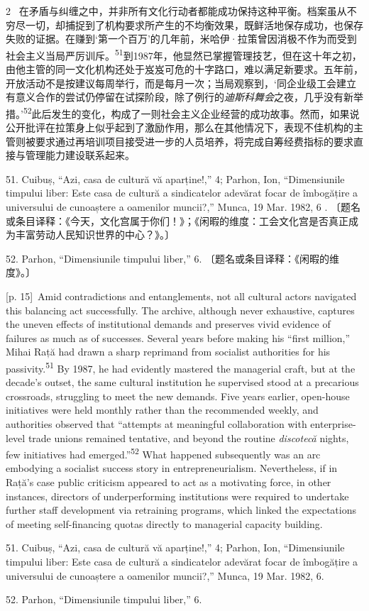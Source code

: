 \documentclass[10pt,a4paper]{article}
\begin{document}
\begin{paracol}{2}
\switchcolumn*
{\scriptsize\color{gray} [p. 15]}\ 在矛盾与纠缠之中，并非所有文化行动者都能成功保持这种平衡。档案虽从不穷尽一切，却捕捉到了机构要求所产生的不均衡效果，既鲜活地保存成功，也保存失败的证据。在赚到‘第一个百万’的几年前，米哈伊·拉策曾因消极不作为而受到社会主义当局严厉训\mbox{斥。\textsuperscript{51}}到1987年，他显然已掌握管理技艺，但在这十年之初，由他主管的同一文化机构还处于岌岌可危的十字路口，难以满足新要求。五年前，开放活动不是按建议每周举行，而是每月一次；当局观察到，‘同企业级工会建立有意义合作的尝试仍停留在试探阶段，除了例行的\textit{迪斯科舞会}之夜，几乎没有新举措。’\nobreak\textsuperscript{52}此后发生的变化，构成了一则社会主义企业经营的成功故事。然而，如果说公开批评在拉策身上似乎起到了激励作用，那么在其他情况下，表现不佳机构的主管则被要求通过再培训项目接受进一步的人员培养，将完成自筹经费指标的要求直接与管理能力建设联系起来。\par{\small 51. Cuibuș, “Azi, casa de cultură vă aparține!,” 4; Parhon, Ion, “Dimensiunile timpului liber: Este casa de cultură a sindicatelor adevărat focar de îmbogățire a universului de cunoaștere a oamenilor muncii?,” Munca, 19 Mar. 1982, 6 . 〔题名或条目译释：《今天，文化宫属于你们！》；《闲暇的维度：工会文化宫是否真正成为丰富劳动人民知识世界的中心？》。〕\par}{\small 52. Parhon, “Dimensiunile timpului liber,” 6. 〔题名或条目译释：《闲暇的维度》。〕\par}
\switchcolumn
{\scriptsize\color{gray} [p. 15]}\ Amid contradictions and entanglements, not all cultural actors navigated this balancing act successfully. The archive, although never exhaustive, captures the uneven effects of institutional demands and preserves vivid evidence of failures as much as of successes. Several years before making his “first million,” Mihai Rață had drawn a sharp reprimand from socialist authorities for his passivity.\nobreak\textsuperscript{51} By 1987, he had evidently mastered the managerial craft, but at the decade’s outset, the same cultural institution he supervised stood at a precarious crossroads, struggling to meet the new demands. Five years earlier, open-house initiatives were held monthly rather than the recommended weekly, and authorities observed that “attempts at meaningful collaboration with enterprise-level trade unions remained tentative, and beyond the routine \textit{discotecă} nights, few initiatives had emerged.”\nobreak\textsuperscript{52} What happened subsequently was an arc embodying a socialist success story in entrepreneurialism. Nevertheless, if in Rață’s case public criticism appeared to act as a motivating force, in other instances, directors of underperforming institutions were required to undertake further staff development via retraining programs, which linked the expectations of meeting self-financing quotas directly to managerial capacity building.\par{\small 51. Cuibuș, “Azi, casa de cultură vă aparține!,” 4; Parhon, Ion, “Dimensiunile timpului liber: Este casa de cultură a sindicatelor adevărat focar de îmbogățire a universului de cunoaștere a oamenilor muncii?,” Munca, 19 Mar. 1982, 6.\par}{\small 52. Parhon, “Dimensiunile timpului liber,” 6.\par}

\end{paracol}
\end{document}
